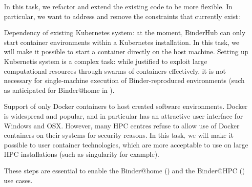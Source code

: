 \begin{task}[
  title=Reducing technical constraints to enable broader usage,
  id=constraints,
  lead=SRL,
  PM=1,
  wphases={0-36},
  partners={MP}
]

In this task, we refactor and extend the existing code to be more flexible. In
particular, we want to address and remove the constraints that currently exist:

\begin{compactitem}
\item Dependency of existing Kubernetes system: at the moment, BinderHub can
  only start container environments within a Kubernetes installation. In this
  task, we will make it possible to start a container directly on the host
  machine. Setting up Kubernetis system is a complex task: while justified to
  exploit large computational resources through swarms of containers
  effectively, it is not necessary for single-machine execution of
  Binder-reproduced environments (such as anticipated for Binder@home in
  ).
\item Support of only Docker containers to host created software environments.
  Docker is widespread and popular, and in particular has an attractive user
  interface for Windows and OSX. However, many HPC centres refuse to allow use
  of Docker containers on their systems for security reasons. In this task, we
  will make it possible to user container technologies, which are more
  acceptable to use on large HPC installations (such as singularity for
  example).
  \end{compactitem}

  These steps are essential to enable the Binder@home
  () and the Binder@HPC
  () use cases. 
  
\end{task}
